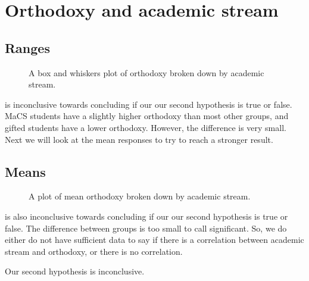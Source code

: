 \chapter{Orthodoxy and academic stream}

\section{Ranges}
\begin{figure}[H]
	\caption{A box and whiskers plot of orthodoxy broken down by academic stream.}
	\label{fig:streamOrthodoxyWhiskers}
\end{figure}
 is inconclusive towards concluding if our our second hypothesis is true or false.
MaCS students have a slightly higher orthodoxy than most other groups, and gifted students have a lower orthodoxy.
However, the difference is very small.
Next we will look at the mean responses to try to reach a stronger result.

\section{Means}
\begin{figure}[H]
	\caption{A plot of mean orthodoxy broken down by academic stream.}
	\label{fig:streamOrthodoxyMean}
\end{figure}
 is also inconclusive towards concluding if our our second hypothesis is true or false.
The difference between groups is too small to call significant.
So, we do either do not have sufficient data to say if there is a correlation between academic stream and orthodoxy, or there is no correlation.

Our second hypothesis is inconclusive.
